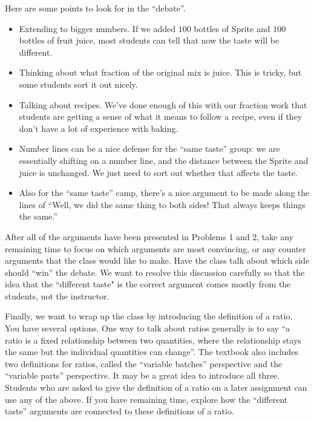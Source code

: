 \documentclass{ximera}
\begin{document}
\begin{instructorNotes}
Here are some points to look for in the ``debate''.
\begin{itemize}
    \item Extending to bigger numbers.  If we added $100$ bottles of Sprite and $100$ bottles of fruit juice, most students can tell that now the taste will be different.
    \item Thinking about what fraction of the original mix is juice.  This is tricky, but some students sort it out nicely.
    \item Talking about recipes.  We've done enough of this with our fraction work that students are getting a sense of what it means to follow a recipe, even if they don't have a lot of experience with baking.
    \item Number lines can be a nice defense for the ``same taste'' group: we are essentially shifting on a number line, and the distance between the Sprite and juice is unchanged.  We just need to sort out whether that affects the taste.
    \item Also for the ``same taste'' camp, there's a nice argument to be made along the lines of ``Well, we did the same thing to both sides!  That always keeps things the same.''  
\end{itemize}


After all of the arguments have been presented in Problems 1 and 2, take any remaining time to focus on which arguments are most convincing, or any counter arguments that the class would like to make. Have the class talk about which side should ``win'' the debate. We want to resolve this discussion carefully so that the idea that the ``different taste" is the correct argument comes mostly from the students, not the instructor.

Finally, we want to wrap up the class by introducing the definition of a ratio. You have several options. One way to talk about ratios generally is to say ``a ratio is a fixed relationship between two quantities, where the relationship stays the same but the individual quantities can change''. The textbook also includes two definitions for ratios, called the ``variable batches'' perspective and the ``variable parts'' perspective. It may be a great idea to introduce all three. Students who are asked to give the definition of a ratio on a later assignment can use any of the above. If you have remaining time, explore how the ``different taste'' arguments are connected to these definitions of a ratio.


\end{instructorNotes}
\end{document}

